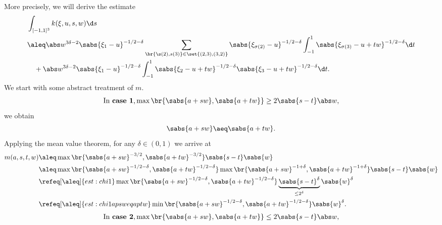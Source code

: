 More precisely, we will derive the estimate
\begin{subequations}\label{eq:k-est}
\begin{align}
 &\int_{[-1,1]^3} {k(\xi,u,s,w)}\d s \nonumber\\
 &\aleq \abs w^{3\delta-2}\sabs{\xi_1-u}^{-1/2-\delta}
        \sum_{\br{\s(2),s(3)}\in\set{(2,3),(3,2)}}\sabs{\xi_{\sigma(2)}-u}^{-1/2-\delta}\int_{-1}^1\sabs{\xi_{\sigma(3)}-u+tw}^{-1/2-\delta}\d t
        \label{eq:typI}\\
 &\quad{}+\abs w^{3\delta-2}\sabs{\xi_1-u}^{-1/2-\delta}
        \int_{-1}^1\sabs{\xi_{2}-u+tw}^{-1/2-\delta}\sabs{\xi_{3}-u+tw}^{-1/2-\delta}\d t.
        \label{eq:typII}
\end{align}
\end{subequations}
We start with some abstract treatment of $m$.
\setlength{\multlinegap}{0ex}%
\begin{multline}\label{eq:est:chi1}
 \text{In \textbf{case~1},}\hfill
 \max\br{\sabs{a+sw},\sabs{a+tw}}\ge2\sabs{s-t}\abs w,\hfill
\end{multline}
we obtain
\begin{equation}\label{eq:est:chi1apsweqaptw}
 \sabs{a+sw} \aeq \sabs{a+tw}.
\end{equation}
Applying the mean value theorem, for any $\delta\in(0,1)$ we arrive at
\begin{align}
  m(a,s,t,w)
  &\aleq \max\br{\sabs{a+sw}^{-3/2},\sabs{a+tw}^{-3/2}}\sabs{s-t}\sabs{w} \nonumber\\
  &\aleq \max\br{\sabs{a+sw}^{-1/2-\delta},\sabs{a+tw}^{-1/2-\delta}}\max\br{\sabs{a+sw}^{-1+\delta},\sabs{a+tw}^{-1+\delta}}\sabs{s-t}\sabs{w} \nonumber\\
  &\refeq[\aleq]{est:chi1}\max\br{\sabs{a+sw}^{-1/2-\delta},\sabs{a+tw}^{-1/2-\delta}}\underbrace{\sabs{s-t}^\delta}_{\le2^\delta}\sabs{w}^\delta \nonumber\\
  &\refeq[\aleq]{est:chi1apsweqaptw}\min\br{\sabs{a+sw}^{-1/2-\delta},\sabs{a+tw}^{-1/2-\delta}}\sabs{w}^\delta. \label{eq:est:chi1roughest}
\end{align}
\begin{multline}\label{eq:est:chi2}
 \text{In \textbf{case~2},}\hfill
 \max\br{\sabs{a+sw},\sabs{a+tw}}\le2\sabs{s-t}\abs w,\hfill
\end{multline}
